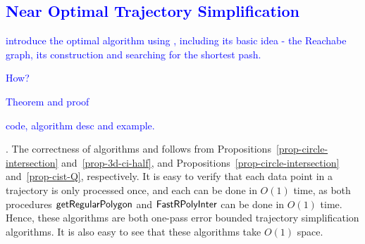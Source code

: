 \subsection{\textcolor{blue}{Near Optimal Trajectory Simplification}}



\textcolor{blue}{introduce the optimal algorithm using \sed, including its basic idea - the Reachabe graph, its construction and searching for the shortest pash.}


\textcolor{blue}{How?}

\textcolor{blue}{Theorem and proof}


\textcolor{blue}{code, algorithm desc and example.}


.
%
The correctness of algorithms \cist and \cista follows from Propositions~\ref{prop-circle-intersection} and~\ref{prop-3d-ci-half}, and Propositions~\ref{prop-circle-intersection} and~\ref{prop-cist-Q}, respectively.
%
It is easy to verify that each data point in a trajectory is only processed once, and each can be done in $O(1)$ time,
as both procedures  ${\mathsf{getRegularPolygon}}$ and ${\mathsf{FastRPolyInter}}$ can be done in $O(1)$ time.
Hence, these algorithms are both one-pass error bounded trajectory simplification algorithms.
It is also easy to see that these algorithms take $O(1)$ space.




